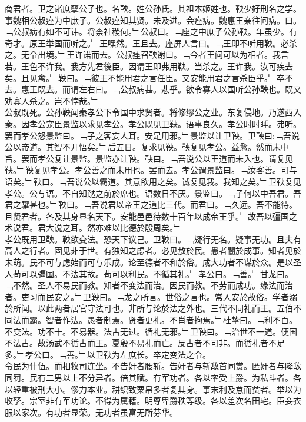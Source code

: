 \documentclass{zhvt-classic}
\begin{document}

\hspace*{2em}商君者。卫之诸庶孽公子也。名鞅。姓公孙氏。其祖本姬姓也。鞅少好刑名之学。事魏相公叔痤为中庶子。公叔痤知其贤。未及进。会痤病。魏惠王亲往问病。曰。﹁公叔病有如不可讳。将柰社稷何。﹂公叔曰。﹁座之中庶子公孙鞅。年虽少。有奇才。原王举国而听之。﹂王嘿然。王且去。座屏人言曰。﹁王即不听用鞅。必杀之。无令出境。﹂王许诺而去。公叔痤召鞅谢曰。﹁今者王问可以为相者。我言若。王色不许我。我方先君後臣。因谓王即弗用鞅。当杀之。王许我。汝可疾去矣。且见禽。﹂鞅曰。﹁彼王不能用君之言任臣。又安能用君之言杀臣乎。﹂卒不去。惠王既去。而谓左右曰。﹁公叔病甚。悲乎。欲令寡人以国听公孙鞅也。既又劝寡人杀之。岂不悖哉。﹂\\
\hspace*{2em}公叔既死。公孙鞅闻秦孝公下令国中求贤者。将修缪公之业。东复侵地。乃遂西入秦。因孝公宠臣景监以求见孝公。孝公既见卫鞅。语事良久。孝公时时睡。弗听。罢而孝公怒景监曰。﹁子之客妄人耳。安足用邪。﹂景监以让卫鞅。卫鞅曰:﹁吾说公以帝道。其智不开悟矣。﹂后五日。复求见鞅。鞅复见孝公。益愈。然而未中旨。罢而孝公复让景监。景监亦让鞅。鞅曰。﹁吾说公以王道而未入也。请复见鞅。﹂鞅复见孝公。孝公善之而未用也。罢而去。孝公谓景监曰。﹁汝客善。可与语矣。﹂鞅曰。﹁吾说公以霸道。其意欲用之矣。诚复见我。我知之矣。﹂卫鞅复见孝公。公与语。不自知跶之前於席也。语数日不厌。景监曰。﹁子何以中吾君。吾君之驩甚也。﹂鞅曰。﹁吾说君以帝王之道比三代。而君曰。﹁久远。吾不能待。且贤君者。各及其身显名天下。安能邑邑待数十百年以成帝王乎。﹂故吾以彊国之术说君。君大说之耳。然亦难以比德於殷周矣。﹂\\
\hspace*{2em}孝公既用卫鞅。鞅欲变法。恐天下议己。卫鞅曰。﹁疑行无名。疑事无功。且夫有高人之行者。固见非于世。有独知之虑者。必见敖於民。愚者闇於成事。知者见於未萌。民不可与虑始而可与乐成。论至德者不和於俗。成大功者不谋於众。是以圣人苟可以彊国。不法其故。苟可以利民。不循其礼。﹂孝公曰。﹁善。﹂甘龙曰。﹁不然。圣人不易民而教。知者不变法而治。因民而教。不劳而成功。缘法而治者。吏习而民安之。﹂卫鞅曰。﹁龙之所言。世俗之言也。常人安於故俗。学者溺於所闻。以此两者居官守法可也。非所与论於法之外也。三代不同礼而王。五伯不同法而霸。智者作法。愚者制焉。贤者更礼。不肖者拘焉。﹂杜挚曰。﹁利不百。不变法。功不十。不易器。法古无过。循礼无邪。﹂卫鞅曰。﹁治世不一道。便国不法古。故汤武不循古而王。夏殷不易礼而亡。反古者不可非。而循礼者不足多。﹂孝公曰。﹁善。﹂以卫鞅为左庶长。卒定变法之令。\\
\hspace*{2em}令民为什伍。而相牧司连坐。不告奸者腰斩。告奸者与斩敌首同赏。匿奸者与降敌同罚。民有二男以上不分异者。倍其赋。有军功者。各以率受上爵。为私斗者。各以轻重被刑大小。僇力本业。耕织致粟帛多者复其身。事末利及怠而贫者。举以为收孥。宗室非有军功论。不得为属籍。明尊卑爵秩等级。各以差次名田宅。臣妾衣服以家次。有功者显荣。无功者虽富无所芬华。\\
\end{document}
